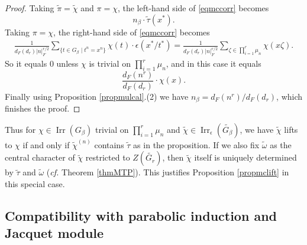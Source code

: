 \documentclass{amsart}
\numberwithin{equation}{section}
\newcommand{\abs}[1]{\left|#1\right|_{F}}
\newcommand{\mrirr}{\operatorname{Irr}}
\newcommand{\dF}[1]{d_{F}(#1)}
\newcommand{\wt}[1]{\widetilde{#1}}
\begin{document}
	\begin{proof}
		
		Taking $\wt{\pi}=\wt{\chi}$ and $\pi=\chi$, the left-hand side of \eqref{eqmccorr} becomes 
		$$n_{\beta}\cdot\wt{\tau}(x^{*}).$$
		Taking $\pi=\chi$, the right-hand side of \eqref{eqmccorr} becomes
		\begin{align*}
			\frac{1}{\dF{d_{r}}\abs{n}^{r/2}}\sum_{\{t\in G_{\beta}\mid t^{n}=x^{n}\}}\chi(t)\cdot\epsilon(x^{*}/t^{*})=\frac{1}{\dF{d_{r}}\abs{n}^{r/2}}\sum_{\zeta\in\prod_{i=1}^{r}\mu_{n}}\chi(x\zeta).
		\end{align*}
		So it equals $0$ unless $\chi$ is trivial on $\prod_{i=1}^{r}\mu_{n}$, and in this case it equals 
		$$\frac{\dF{n^{r}}}{\dF{d_{r}}}\cdot\chi(x).$$
		Finally using Proposition \ref{propmulcal}.(2) we have $n_{\beta}=\dF{n^{r}}/\dF{d_{r}}$, which finishes the proof.
		
	\end{proof}
	
	Thus for $\chi\in\mrirr(G_{\beta})$ trivial on $\prod_{i=1}^{r}\mu_{n}$ and $\wt{\chi}\in\mrirr_{\epsilon}(\wt{G_{\beta}})$, we have $\wt{\chi}$ lifts to $\chi$ if and only if $\wt{\chi}^{(n)}$ contains $\wt{\tau}$ as in the proposition. If we also fix $\wt{\omega}$ as the central character of $\wt{\chi}$ restricted to $Z(\wt{G_{r}})$, then $\wt{\chi}$ itself is uniquely determined by $\wt{\tau}$ and $\wt{\omega}$ (\emph{cf.} Theorem \ref{thmMTP}). This justifies Proposition \ref{propmclift} in this special case.
	
	\subsection{Compatibility with parabolic induction and Jacquet module}\label{subsectioncomppindjac}
	
\end{document}
